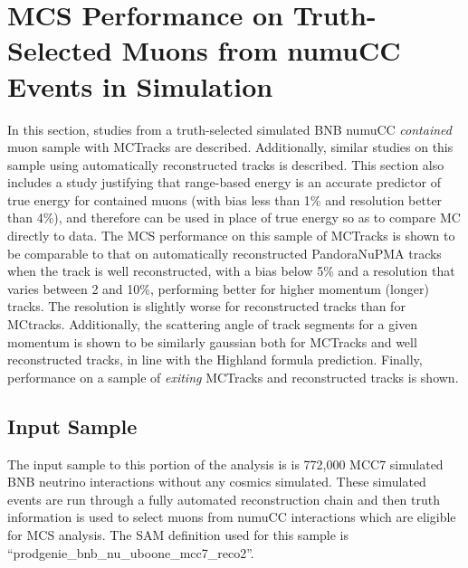 
\section{MCS Performance on Truth-Selected Muons from numuCC Events in Simulation}\label{MCBNB_performance_section}


In this section, studies from a truth-selected simulated BNB numuCC \textit{contained} muon sample with {\sc MCTracks} are described. Additionally, similar studies on this sample using automatically reconstructed tracks is described. This section also includes a study justifying that range-based energy is an accurate predictor of true energy for contained muons (with bias less than 1\% and resolution better than 4\%), and therefore can be used in place of true energy so as to compare MC directly to data. The MCS performance on this sample of {\sc MCTracks} is shown to be comparable to that on automatically reconstructed PandoraNuPMA tracks when the track is well reconstructed, with a bias below 5\% and a resolution that varies between 2 and 10\%, performing better for higher momentum (longer) tracks. The resolution is slightly worse for reconstructed tracks than for {\sc MCtracks}. Additionally, the scattering angle of track segments for a given momentum is shown to be similarly gaussian both for {\sc MCTracks} and well reconstructed tracks, in line with the Highland formula prediction. Finally, performance on a sample of \textit{exiting} {\sc MCTracks} and reconstructed tracks is shown.

\subsection{Input Sample}\label{MCBNB_input_sample_section}
The input sample to this portion of the analysis is is 772,000 MCC7 simulated BNB neutrino interactions without any cosmics simulated. These simulated events are run through a fully automated reconstruction chain and then truth information is used to select muons from numuCC interactions which are eligible for MCS analysis. The SAM definition used for this sample is ``prodgenie\_bnb\_nu\_uboone\_mcc7\_reco2''.


